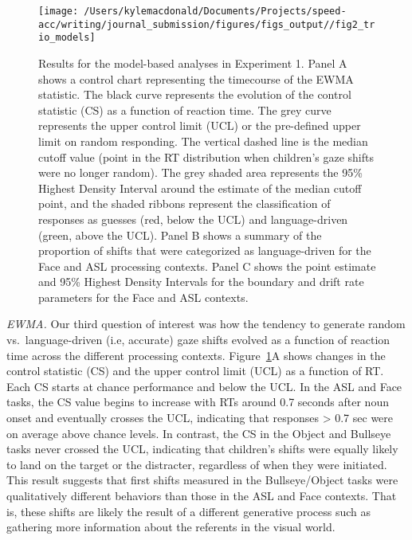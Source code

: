 \documentclass[,man,floatsintext]{apa6}
\begin{document}
\begin{figure}[!t]

{\centering \texttt{[image: /Users/kylemacdonald/Documents/Projects/speed-acc/writing/journal\_submission/figures/figs\_output//fig2\_trio\_models]} 

}

\caption{Results for the model-based analyses in Experiment 1. Panel A shows a control chart representing the timecourse of the EWMA statistic. The black curve represents the evolution of the control statistic (CS) as a function of reaction time. The grey curve represents the upper control limit (UCL) or the pre-defined upper limit on random responding. The vertical dashed line is the median cutoff value (point in the RT distribution when children's gaze shifts were no longer random). The grey shaded area represents the 95\% Highest Density Interval around the estimate of the median cutoff point, and the shaded ribbons represent the classification of responses as guesses (red, below the UCL) and language-driven (green, above the UCL). Panel B shows a summary of the proportion of shifts that were categorized as language-driven for the Face and ASL processing contexts. Panel C shows the point estimate and 95\% Highest Density Intervals for the boundary and drift rate parameters for the Face and ASL contexts.}\label{fig:trio-model-plot}
\end{figure}

\emph{EWMA.} Our third question of interest was how the tendency to
generate random vs.~language-driven (i.e, accurate) gaze shifts evolved
as a function of reaction time across the different processing contexts.
Figure~\ref{fig:trio-model-plot}A shows changes in the control statistic
(CS) and the upper control limit (UCL) as a function of RT. Each CS
starts at chance performance and below the UCL. In the ASL and Face
tasks, the CS value begins to increase with RTs around 0.7 seconds after
noun onset and eventually crosses the UCL, indicating that responses
\textgreater{} 0.7 sec were on average above chance levels. In contrast,
the CS in the Object and Bullseye tasks never crossed the UCL,
indicating that children's shifts were equally likely to land on the
target or the distracter, regardless of when they were initiated. This
result suggests that first shifts measured in the Bullseye/Object tasks
were qualitatively different behaviors than those in the ASL and Face
contexts. That is, these shifts are likely the result of a different
generative process such as gathering more information about the
referents in the visual world.
\end{document}
